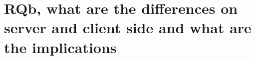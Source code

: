 \documentclass[../thesis.tex]{subfiles}
\begin{document}
\noindent

\section{RQb, what are the differences on server and client side and what are the implications}
\end{document}
